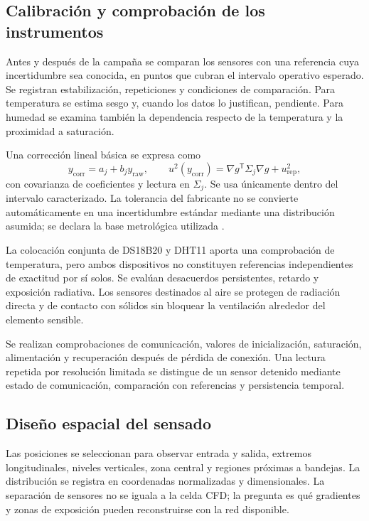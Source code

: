 \subsection{Calibración y comprobación de los instrumentos}

Antes y después de la campaña se comparan los sensores con una referencia cuya incertidumbre sea conocida, en puntos que cubran el intervalo operativo esperado. Se registran estabilización, repeticiones y condiciones de comparación. Para temperatura se estima sesgo y, cuando los datos lo justifican, pendiente. Para humedad se examina también la dependencia respecto de la temperatura y la proximidad a saturación.

Una corrección lineal básica se expresa como
\begin{equation}
y_{\mathrm{corr}}=a_j+b_jy_{\mathrm{raw}},
\qquad
u^2(y_{\mathrm{corr}})=
\nabla g^{\mathsf T}\Sigma_j\nabla g+u_{\mathrm{rep}}^2,
\label{met:correccion_sensor}
\end{equation}
con covarianza de coeficientes y lectura en $\Sigma_j$. Se usa únicamente dentro del intervalo caracterizado. La tolerancia del fabricante no se convierte automáticamente en una incertidumbre estándar mediante una distribución asumida; se declara la base metrológica utilizada \cite{jcgm2008}.

La colocación conjunta de DS18B20 y DHT11 aporta una comprobación de temperatura, pero ambos dispositivos no constituyen referencias independientes de exactitud por sí solos. Se evalúan desacuerdos persistentes, retardo y exposición radiativa. Los sensores destinados al aire se protegen de radiación directa y de contacto con sólidos sin bloquear la ventilación alrededor del elemento sensible.

Se realizan comprobaciones de comunicación, valores de inicialización, saturación, alimentación y recuperación después de pérdida de conexión. Una lectura repetida por resolución limitada se distingue de un sensor detenido mediante estado de comunicación, comparación con referencias y persistencia temporal.

\subsection{Diseño espacial del sensado}

Las posiciones se seleccionan para observar entrada y salida, extremos longitudinales, niveles verticales, zona central y regiones próximas a bandejas. La distribución se registra en coordenadas normalizadas y dimensionales. La separación de sensores no se iguala a la celda CFD; la pregunta es qué gradientes y zonas de exposición pueden reconstruirse con la red disponible.

